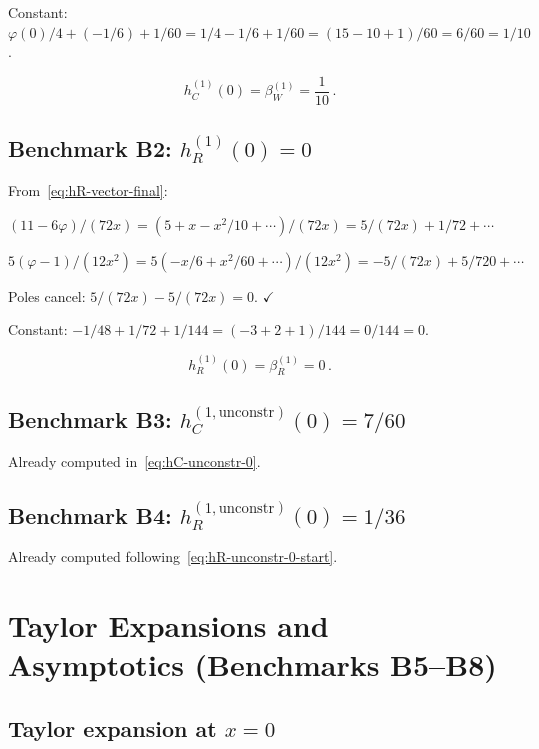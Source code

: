 \documentclass[12pt,a4paper]{article}
\theoremstyle{definition}
\theoremstyle{remark}
\begin{document}
Constant:
$\varphi(0)/4 + (-1/6) + 1/60
= 1/4 - 1/6 + 1/60
= (15 - 10 + 1)/60 = 6/60 = 1/10$.

\begin{equation}
  \boxed{h_C^{(1)}(0) = \beta_W^{(1)} = \frac{1}{10}\,.}
  \label{eq:B1-check}
\end{equation}

\subsection{Benchmark B2: $h_R^{(1)}(0) = 0$}

From~\eqref{eq:hR-vector-final}:

$(11-6\varphi)/(72x) = (5 + x - x^2/10 + \cdots)/(72x)
= 5/(72x) + 1/72 + \cdots$

$5(\varphi-1)/(12x^2) = 5(-x/6 + x^2/60 + \cdots)/(12x^2)
= -5/(72x) + 5/720 + \cdots$

Poles cancel: $5/(72x) - 5/(72x) = 0$. $\checkmark$

Constant:
$-1/48 + 1/72 + 1/144
= (-3 + 2 + 1)/144 = 0/144 = 0$.

\begin{equation}
  \boxed{h_R^{(1)}(0) = \beta_R^{(1)} = 0\,.}
  \label{eq:B2-check}
\end{equation}


\subsection{Benchmark B3: $h_C^{(1,\mathrm{unconstr})}(0) = 7/60$}

Already computed in~\eqref{eq:hC-unconstr-0}.

\subsection{Benchmark B4: $h_R^{(1,\mathrm{unconstr})}(0) = 1/36$}

Already computed following~\eqref{eq:hR-unconstr-0-start}.


\section{Taylor Expansions and Asymptotics (Benchmarks B5--B8)}
\label{sec:expansions}

\subsection{Taylor expansion at $x = 0$}
\end{document}
